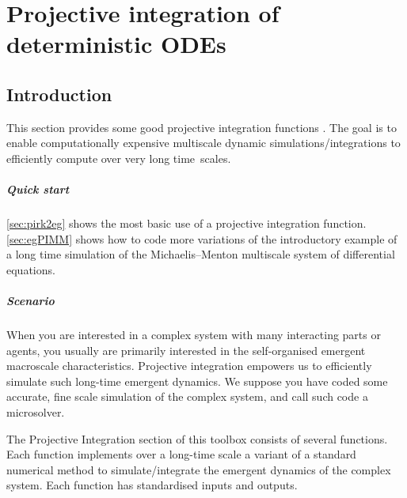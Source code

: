 \chapter{Projective integration of deterministic ODEs}
\label{sec:ProjInt}
\localtableofcontents


\section{Introduction}

This section provides some good projective integration functions \cite[e.g.]{Gear02b, Gear03c, Givon06, Maclean2015, Sieber2018}.
The goal is to enable computationally expensive multiscale dynamic simulations\slash integrations to efficiently compute over very long time~scales.

\paragraph{Quick start} 
\cref{sec:pirk2eg} shows the most basic use of a projective integration function.
\cref{sec:egPIMM} shows how to code more variations of the introductory example of a long time simulation of the Michaelis--Menton multiscale system of differential equations.

\paragraph{Scenario}
When you are interested in a complex system with many interacting parts or agents, you usually are primarily interested in the self-organised emergent macroscale characteristics.
Projective integration empowers us to efficiently simulate such long-time emergent dynamics.
We suppose you have coded some accurate, fine scale simulation of the complex system, and call such code a microsolver.

The Projective Integration section of this toolbox consists of several functions.
Each function implements over a long-time scale a variant of a standard numerical method to simulate\slash integrate the emergent dynamics of the complex system.
Each function has standardised inputs and outputs.


